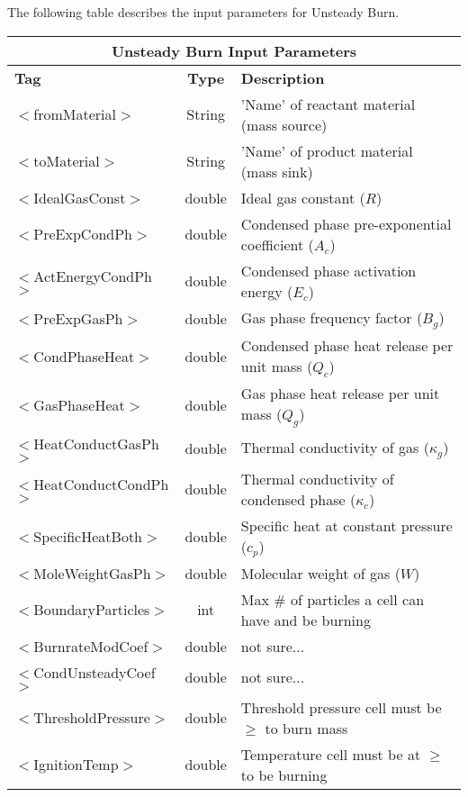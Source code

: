 The following table describes the input parameters for Unsteady Burn.

\begin{center}
\begin{tabular}{| l | c | p{7cm} |}
\hline  
  \multicolumn{3}{|c|}{\textbf{Unsteady Burn Input Parameters}} \\
\hline
  \textbf{Tag} & \textbf{Type} & \textbf{Description}\\
\hline
  $<$fromMaterial$>$ & String & 'Name' of reactant material (mass source)\\
\hline
  $<$toMaterial$>$ & String & 'Name' of product material (mass sink)\\
\hline
  $<$IdealGasConst$>$ & double & Ideal gas constant ($R$)\\
\hline
  $<$PreExpCondPh$>$ & double & Condensed phase pre-exponential coefficient ($A_c$) \\
\hline
  $<$ActEnergyCondPh$>$ & double & Condensed phase activation energy ($E_c$)\\
\hline
  $<$PreExpGasPh$>$ & double & Gas phase frequency factor ($B_g$)\\
\hline
  $<$CondPhaseHeat$>$ & double & Condensed phase heat release per unit mass ($Q_c$)\\
\hline
  $<$GasPhaseHeat$>$ & double & Gas phase heat release per unit mass ($Q_g$)\\
\hline
  $<$HeatConductGasPh$>$ & double & Thermal conductivity of gas ($\kappa_g$)\\
\hline
  $<$HeatConductCondPh$>$ & double & Thermal conductivity of condensed phase ($\kappa_c$)\\
\hline
  $<$SpecificHeatBoth$>$ & double & Specific heat at constant pressure ($c_p$)\\
\hline
  $<$MoleWeightGasPh$>$ & double & Molecular weight of gas ($W$)\\
\hline
  $<$BoundaryParticles$>$ & int & Max \# of particles a cell can have and be burning\\
\hline
  $<$BurnrateModCoef$>$ & double & not sure... \\
\hline
  $<$CondUnsteadyCoef$>$ & double & not sure... \\
\hline
  $<$ThresholdPressure$>$ & double & Threshold pressure cell must be $\ge$ to burn mass\\
\hline
  $<$IgnitionTemp$>$ & double & Temperature cell must be at $\ge$ to be burning\\
\hline
\end{tabular}
\end{center}

